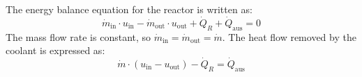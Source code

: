 The energy balance equation for the reactor is written as:  
\[
\dot{m}_{\text{in}} \cdot u_{\text{in}} - \dot{m}_{\text{out}} \cdot u_{\text{out}} + \dot{Q}_R + \dot{Q}_{\text{aus}} = 0
\]  
The mass flow rate is constant, so \( \dot{m}_{\text{in}} = \dot{m}_{\text{out}} = \dot{m} \). The heat flow removed by the coolant is expressed as:  
\[
\dot{m} \cdot \left( u_{\text{in}} - u_{\text{out}} \right) - \dot{Q}_R = \dot{Q}_{\text{aus}}
\]
